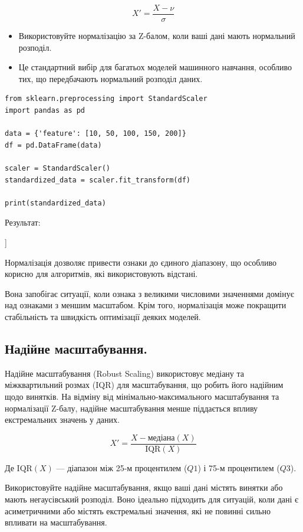 $$X' = \frac{X-\nu}{\sigma}$$

\begin{itemize}
\item Використовуйте нормалізацію за Z-балом, коли ваші дані мають нормальний розподіл.
\item Це стандартний вибір для багатьох моделей машинного навчання, особливо тих, що передбачають нормальний розподіл даних.
\end{itemize}

\begin{lstlisting}
from sklearn.preprocessing import StandardScaler
import pandas as pd

data = {'feature': [10, 50, 100, 150, 200]}
df = pd.DataFrame(data)

scaler = StandardScaler()
standardized_data = scaler.fit_transform(df)

print(standardized_data)
\end{lstlisting}

Результат:

\begin{console}
[[-1.35411306]
 [-0.76536825]
 [-0.02943724]
 [ 0.70649377]
 [ 1.44242478]]
\end{console}

Нормалізація дозволяє привести ознаки до єдиного діапазону, що особливо корисно для алгоритмів, які використовують відстані.

Вона запобігає ситуації, коли ознака з великими числовими значеннями домінує над ознаками з меншим масштабом. Крім того, нормалізація може покращити стабільність та швидкість оптимізації деяких моделей.


\subsection{Надійне масштабування.}

Надійне масштабування (Robust Scaling) використовує медіану та міжквартильний розмах (IQR) для масштабування, що робить його 
надійним щодо винятків. На відміну від мінімально-максимального масштабування та 
нормалізації Z-балу, надійне масштабування менше піддається впливу екстремальних 
значень у даних.

$$X'=\frac{X - \text{медіана}(X)} {\text{IQR}(X)}$$

Де $\text{IQR}(X)$ — діапазон між 25-м процентилем ($Q1$) і 75-м процентилем ($Q3$).

Використовуйте надійне масштабування, якщо ваші дані містять винятки або мають негаусівський розподіл.
Воно ідеально підходить для ситуацій, коли дані є асиметричними або містять екстремальні значення, 
які не повинні сильно впливати на масштабування.

